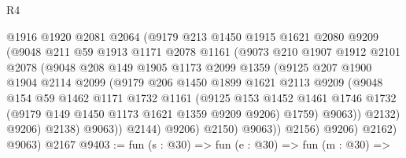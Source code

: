 \begin{lexlean}{R4}
\begin{coremodule}
                      @1916
                      @1920
                      @2081
                      @2064
                      (@9179
                        @213
                        @1450
                        @1915
                        @1621
                        @2080
                        @9209
                        (@9048
                          @211
                          @59
                          @1913
                          @1171
                          @2078
                          @1161
                          (@9073
                            @210
                            @1907
                            @1912
                            @2101
                            @2078
                            (@9048
                              @208
                              @149
                              @1905
                              @1173
                              @2099
                              @1359
                              (@9125
                                @207
                                @1900
                                @1904
                                @2114
                                @2099
                                (@9179
                                  @206
                                  @1450
                                  @1899
                                  @1621
                                  @2113
                                  @9209
                                  (@9048
                                    @154
                                    @59
                                    @1462
                                    @1171
                                    @1732
                                    @1161
                                    (@9125
                                      @153
                                      @1452
                                      @1461
                                      @1746
                                      @1732
                                      (@9179 @149 @1450 @1173 @1621 @1359 @9209 @9206)
                                      @1759)
                                    @9063))
                                @2132)
                              @9206)
                            @2138)
                          @9063))
                      @2144)
                    @9206)
                  @2150)
                @9063))
            @2156)
          @9206)
        @2162)
      @9063)
    @2167
@9403 := fun (s : @30) =>
  fun (e : @30) =>
  fun (m : @30) =>

\end{coremodule}
\end{lexlean}
